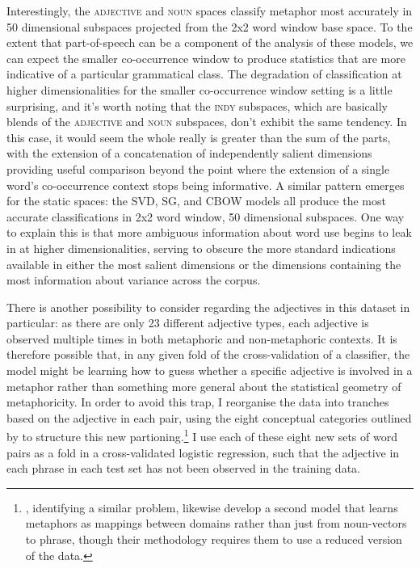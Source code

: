 Interestingly, the \textsc{adjective} and \textsc{noun} spaces classify metaphor most accurately in 50 dimensional subspaces projected from the 2x2 word window base space.  To the extent that part-of-speech can be a component of the analysis of these models, we can expect the smaller co-occurrence window to produce statistics that are more indicative of a particular grammatical class.  The degradation of classification at higher dimensionalities for the smaller co-occurrence window setting is a little surprising, and it's worth noting that the \textsc{indy} subspaces, which are basically blends of the \textsc{adjective} and \textsc{noun} subspaces, don't exhibit the same tendency.  In this case, it would seem the whole really is greater than the sum of the parts, with the extension of a concatenation of independently salient dimensions providing useful comparison beyond the point where the extension of a single word's co-occurrence context stops being informative.  A similar pattern emerges for the static spaces: the \textsc{SVD}, \textsc{SG}, and \textsc{CBOW} models all produce the most accurate classifications in 2x2 word window, 50 dimensional subspaces.  One way to explain this is that more ambiguous information about word use begins to leak in at higher dimensionalities, serving to obscure the more standard indications available in either the most salient dimensions or the dimensions containing the most information about variance across the corpus.

There is another possibility to consider regarding the adjectives in this dataset in particular: as there are only 23 different adjective types, each adjective is observed multiple times in both metaphoric and non-metaphoric contexts.  It is therefore possible that, in any given fold of the cross-validation of a classifier, the model might be learning how to guess whether a specific adjective is involved in a metaphor rather than something more general about the statistical geometry of metaphoricity.  In order to avoid this trap, I reorganise the data into tranches based on the adjective in each pair, using the eight conceptual categories outlined by \cite{GutierrezEA2016} to structure this new partioning.\footnote{\cite{GutierrezEA2016}, identifying a similar problem, likewise develop a second model that learns metaphors as mappings between domains rather than just from noun-vectors to phrase, though their methodology requires them to use a reduced version of the data.}  I use each of these eight new sets of word pairs as a fold in a cross-validated logistic regression, such that the adjective in each phrase in each test set has not been observed in the training data.

